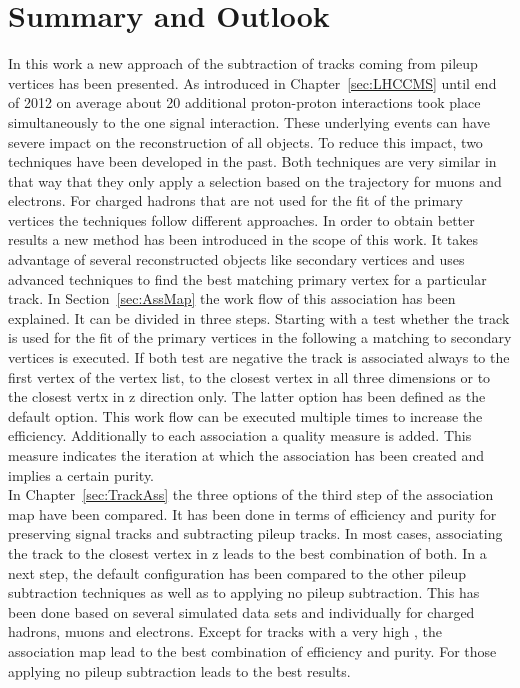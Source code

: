 \chapter{Summary and Outlook \label{sec:SandO}}

In this work a new approach of the subtraction of tracks coming from pileup vertices has been presented. As introduced in Chapter~\ref{sec:LHCCMS} until end of 2012 on average about 20 additional proton-proton interactions took place simultaneously to the one signal interaction. These underlying events can have severe impact on the reconstruction of all objects. To reduce this impact, two techniques have been developed in the past. Both techniques are very similar in that way that they only apply a selection based on the trajectory for muons and electrons. For charged hadrons that are not used for the fit of the primary vertices the techniques follow different approaches. In order to obtain better results a new method has been introduced in the scope of this work. It takes advantage of several reconstructed objects like secondary vertices and uses advanced techniques to find the best matching primary vertex for a particular track. In Section~\ref{sec:AssMap} the work flow of this association has been explained. It can be divided in three steps. Starting with a test whether the track is used for the fit of the primary vertices in the following a matching to secondary vertices is executed. If both test are negative the track is associated always to the first vertex of the vertex list, to the closest vertex in all three dimensions or to the closest vertx in z direction only. The latter option has been defined as the default option. This work flow can be executed multiple times to increase the efficiency. Additionally to each association a quality measure is added. This measure indicates the iteration at which the association has been created and implies a certain purity. \\
In Chapter~\ref{sec:TrackAss} the three options of the third step of the association map have been compared. It has been done in terms of efficiency and purity for preserving signal tracks and subtracting pileup tracks. In most cases, associating the track to the closest vertex in z leads to the best combination of both. In a next step, the default configuration has been compared to the other pileup subtraction techniques as well as to applying no pileup subtraction. This has been done based on several simulated data sets and individually for charged hadrons, muons and electrons. Except for tracks with a very high \pt{}, the association map lead to the best combination of efficiency and purity. For those applying no pileup subtraction leads to the best results. \\
